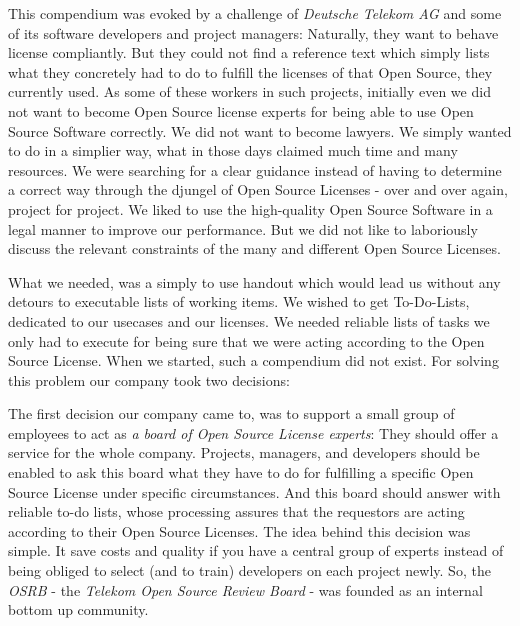 This compendium was evoked by a challenge of \emph{Deutsche Telekom AG} and some
of its software developers and project managers: Naturally, they want to behave
license compliantly. But they could not find a reference text which simply lists
what they concretely had to do to fulfill the licenses of that Open Source, they
currently used. As some of these workers in such projects, initially even we did
not want to become Open Source license experts for being able to use Open Source
Software correctly. We did not want to become lawyers. We simply wanted to do in
a simplier way, what in those days claimed much time and many resources. We were
searching for a clear guidance instead of having to determine a correct way
through the djungel of Open Source Licenses - over and over again, project for
project. We liked to use the high-quality Open Source Software in a legal manner
to improve our performance. But we did not like to laboriously discuss the
relevant constraints of the many and different Open Source Licenses.

What we needed, was a simply to use handout which would lead us without any
detours to executable lists of working items. We wished to get To-Do-Lists,
dedicated to our usecases and our licenses. We needed reliable lists of tasks we
only had to execute for being sure that we were acting according to the Open
Source License. When we started, such a compendium did not exist. For solving
this problem our company took two decisions: 

The first decision our company came to, was to support a small group of
employees to act as \emph{a board of Open Source License experts}: They should
offer a service for the whole company. Projects, managers, and developers should
be enabled to ask this board what they have to do for fulfilling a specific Open
Source License under specific circumstances. And this board should answer with
reliable to-do lists, whose processing assures that the requestors are acting
according to their Open Source Licenses. The idea behind this decision was
simple. It save costs and quality if you have a central group of experts instead
of being obliged to select (and to train) developers on each project newly. So,
the \emph{OSRB} - the \emph{Telekom Open Source Review Board} - was founded as
an internal bottom up community.

